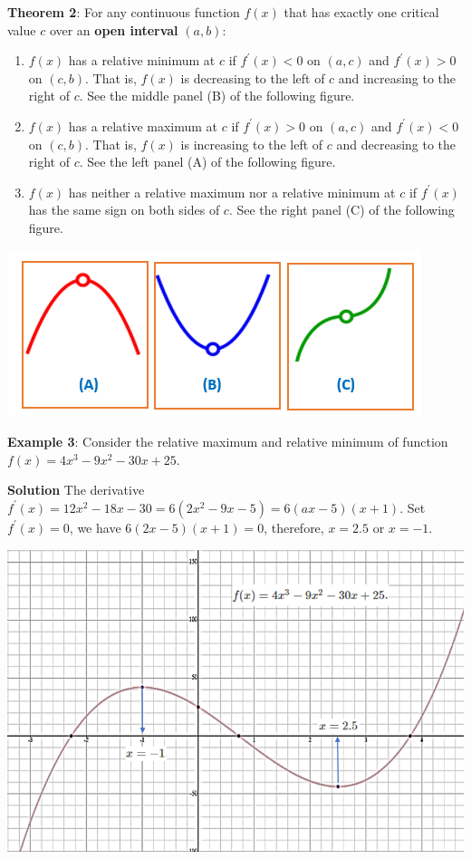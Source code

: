 \documentclass[
]{book}
\begin{document}
\hfill\break

\textbf{Theorem 2}: For any continuous function \(f(x)\) that has exactly one critical value \(c\) over an \textbf{open interval} \((a, b)\):

\begin{enumerate}
\def\labelenumi{\arabic{enumi}.}
\item
  \(f(x)\) has a relative minimum at \(c\) if \(f^\prime(x) < 0\) on \((a, c)\) and \(f^\prime(x) > 0\) on \((c, b)\). That is, \(f(x)\) is decreasing to the left of \(c\) and increasing to the right of \(c\). See the middle panel (B) of the following figure.
\item
  \(f(x)\) has a relative maximum at \(c\) if \(f^\prime(x) > 0\) on \((a, c)\) and \(f^\prime(x) < 0\) on \((c, b)\). That is, \(f(x)\) is increasing to the left of \(c\) and decreasing to the right of \(c\). See the left panel (A) of the following figure.
\item
  \(f(x)\) has neither a relative maximum nor a relative minimum at \(c\) if \(f^\prime(x)\) has the same sign on both sides of \(c\). See the right panel (C) of the following figure.
\end{enumerate}

\begin{center}\includegraphics[width=0.5\linewidth]{img08/w08-Theorem02} \end{center}

\hfill\break

\textbf{Example 3}: Consider the relative maximum and relative minimum of function \(f(x) = 4x^3 - 9x^2 - 30x + 25\).

\textbf{Solution} The derivative \(f^\prime(x) = 12x^2 - 18x -30 = 6(2x^2 - 9x - 5) = 6(ax-5)(x+1)\). Set \(f^\prime(x) = 0\), we have \(6(2x-5)(x+1) = 0\), therefore, \(x = 2.5\) or \(x = -1\).

\begin{center}\includegraphics[width=0.7\linewidth]{img08/w08-Example03} \end{center}
\end{document}
